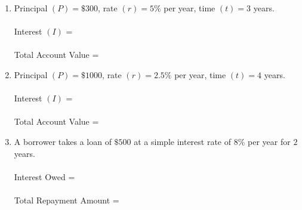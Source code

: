 \documentclass[12pt, letterpaper, fleqn]{article}
\newcommand{\blanklong}{\underline{\hspace{6.5cm}}}
\begin{document}
\begin{enumerate}[itemsep=3cm, leftmargin=0.6cm]
\item Principal $(P) = \$300$, rate $(r) = 5\%$ per year, time $(t) = 3$ years. \\ \\
Interest $(I)$ = \blanklong \\ \\
Total Account Value = \blanklong

\item Principal $(P) = \$1000$, rate $(r) = 2.5\%$ per year, time $(t) = 4$ years. \\ \\
Interest $(I)$ = \blanklong \\ \\
Total Account Value = \blanklong

\item A borrower takes a loan of $\$500$ at a simple interest rate of $8\%$ per year for $2$ years. \\ \\
Interest Owed = \blanklong \\ \\
Total Repayment Amount = \blanklong
\end{enumerate}
\end{document}
